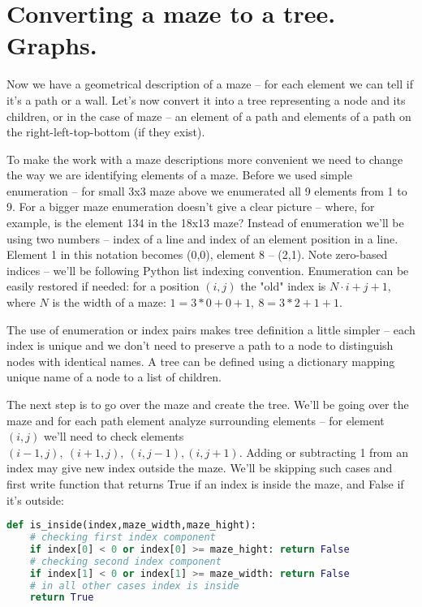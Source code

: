 \section{Converting a maze to a tree. Graphs.}

Now we have a geometrical description
of a maze -- for each element we can tell if it's a path or a wall.
Let's now convert it into a tree representing a node and its children,
or in the case of maze -- an element of a path and
elements of a path on the right-left-top-bottom (if they exist).

To make the work with a maze descriptions more convenient we need to
change the way we are identifying elements of a maze. Before we
used simple enumeration -- for small 3x3 maze above we enumerated all
9 elements from 1 to 9. For a bigger maze enumeration doesn't give a
clear picture -- where, for example, is the element 134 in the 18x13 maze?
 Instead of enumeration we'll be using two numbers -- index of a line
and index of an element position in a line. Element 1 in this notation
becomes (0,0), element 8 -- (2,1). Note zero-based indices -- we'll be
following Python list indexing convention. Enumeration can be easily
restored if needed: for a position $(i,j)$ the "old" 
index is $N\cdot i+j+1$,
where $N$ is the width of a maze: $1=3*0+0+1,\ 8=3*2+1+1$.

The use of enumeration or index pairs makes tree definition 
a little simpler --
each index is unique and we don't need to preserve a path to a node to
distinguish nodes with identical names. A tree can be defined using a
dictionary mapping unique name of a node to a list of children.

The next step is to go over the maze and create the tree. We'll be
going over the maze and for each path element analyze 
surrounding elements --
for element $(i,j)$ we'll need to check elements
$(i-1,j),\ (i+1,j),\ (i,j-1), (i,j+1)$. Adding or subtracting 1
from an index may give new index outside the maze. We'll be
skipping such cases and first write function that returns True
if an index is inside the maze, and False if it's outside:

\begin{lstlisting}[language=Python,style=codelst,caption={Python: checking index position}]
def is_inside(index,maze_width,maze_hight):
    # checking first index component
    if index[0] < 0 or index[0] >= maze_hight: return False
    # checking second index component
    if index[1] < 0 or index[1] >= maze_width: return False
    # in all other cases index is inside
    return True
\end{lstlisting}

